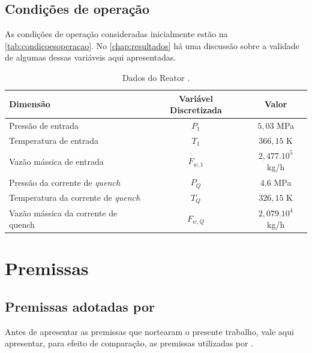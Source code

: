 
\subsection{Condições de operação} \label{sec:condicaocomposicaocorrentes}

As condições de operação consideradas inicialmente estão na
\autoref{tab:condicoesoperacao}. No \autoref{chap:resultados} há uma discussão
sobre a validade de algumas dessas variáveis aqui apresentadas.

\begin{table}[!htb]
\begin{center}
\caption{Dados do Reator \cite{Rojas2014a}.}
\label{tab:condicoesoperacao}
\small
\begin{tabular}{lcc}
{Dimensão} & {Variável Discretizada} & {Valor}
\\
\hline
{Pressão de entrada} & {$P_{1}$} & $5,03$ MPa \\
{Temperatura de entrada} & {$T_{1}$} & $366,15$ K \\
{Vazão mássica de entrada} & {$F_{w,1}$} & $2,477.10^5$ kg/h \\
{Pressão da corrente de \emph{quench}} & {$P_{Q}$} & $4.6$ MPa \\
{Temperatura da corrente de \emph{quench}} & {$T_{Q}$} & $326,15$ K \\
{Vazão mássica da corrente de quench} & {$F_{w,Q}$} & $2,079.10^4$ kg/h \\
\bottomrule
\end{tabular}
\end{center}
\end{table}


\section{Premissas} \label{sec:premissas}

\subsection{Premissas adotadas por }
\label{sec:premissasrojas}

Antes de apresentar as premissas que nortearam o presente trabalho, vale
aqui apresentar, para efeito de comparação, as premissas utilizadas por
.

